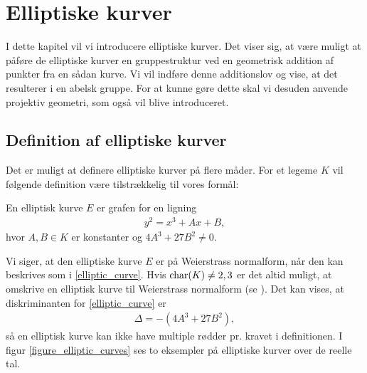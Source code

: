 \chapter{Elliptiske kurver}
I dette kapitel vil vi introducere elliptiske kurver.
Det viser sig, at være muligt at påføre de elliptiske kurver en gruppestruktur ved en geometrisk addition af punkter fra en sådan kurve. Vi vil indføre denne additionslov og vise, at det resulterer i en abelsk gruppe. For at kunne gøre dette skal vi desuden anvende projektiv geometri, som også vil blive introduceret.

\section{Definition af elliptiske kurver}
Det er muligt at definere elliptiske kurver på flere måder. For et legeme $K$ vil følgende definition være tilstrækkelig til vores formål:
\begin{definition}
En elliptisk kurve $E$ er grafen for en ligning
\begin{align}
	\label{elliptic_curve}
	y^2 = x^3 + Ax + B,
\end{align}
hvor $A, B \in K$ er konstanter og $4A^3 + 27B^2 \neq 0$. 
\end{definition}
Vi siger, at den elliptiske kurve $E$ er på Weierstrass normalform, når den kan beskrives som i \eqref{elliptic_curve}. Hvis $\text{char} (K) \neq 2, 3$ er det altid muligt, at omskrive en elliptisk kurve til Weierstrass normalform (se \cite[kapitel~2]{Washington}). Det kan vises, at diskriminanten for \eqref{elliptic_curve} er \begin{align*}
	\Delta = -(4A^3 + 27B^2),
\end{align*}
så en elliptisk kurve kan ikke have multiple rødder pr. kravet i definitionen. I figur \ref{figure_elliptic_curves} ses to eksempler på elliptiske kurver over de reelle tal.
